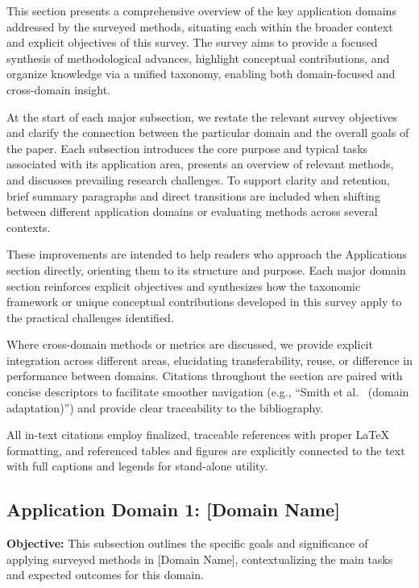\documentclass[sigconf]{acmart}
\begin{document}
This section presents a comprehensive overview of the key application domains addressed by the surveyed methods, situating each within the broader context and explicit objectives of this survey. The survey aims to provide a focused synthesis of methodological advances, highlight conceptual contributions, and organize knowledge via a unified taxonomy, enabling both domain-focused and cross-domain insight.

At the start of each major subsection, we restate the relevant survey objectives and clarify the connection between the particular domain and the overall goals of the paper. Each subsection introduces the core purpose and typical tasks associated with its application area, presents an overview of relevant methods, and discusses prevailing research challenges. To support clarity and retention, brief summary paragraphs and direct transitions are included when shifting between different application domains or evaluating methods across several contexts.

These improvements are intended to help readers who approach the Applications section directly, orienting them to its structure and purpose. Each major domain section reinforces explicit objectives and synthesizes how the taxonomic framework or unique conceptual contributions developed in this survey apply to the practical challenges identified.

Where cross-domain methods or metrics are discussed, we provide explicit integration across different areas, elucidating transferability, reuse, or difference in performance between domains. Citations throughout the section are paired with concise descriptors to facilitate smoother navigation (e.g., ``Smith et al.~\cite{smith2021} (domain adaptation)'') and provide clear traceability to the bibliography.

All in-text citations employ finalized, traceable references with proper LaTeX formatting, and referenced tables and figures are explicitly connected to the text with full captions and legends for stand-alone utility.


\subsection{Application Domain 1: [Domain Name]}
\textbf{Objective:} This subsection outlines the specific goals and significance of applying surveyed methods in [Domain Name], contextualizing the main tasks and expected outcomes for this domain.
\end{document}
